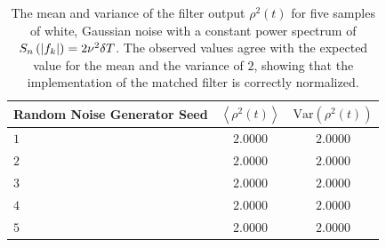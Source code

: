 \begin{table}[p]
\label{t:normresults}
\begin{center}
\begin{tabular}{l|c|c}
Random Noise Generator Seed& $\left\langle \rho^2(t) \right\rangle$ & $\mathrm{Var}( \rho^2(t) )$\\
\hline
$1$ & $2.0000$ & $2.0000$ \\
$2$ & $2.0000$ & $2.0000$ \\
$3$ & $2.0000$ & $2.0000$ \\
$4$ & $2.0000$ & $2.0000$ \\
$5$ & $2.0000$ & $2.0000$ \\
\end{tabular}
\end{center}
\caption[Mean and Variance of the Matched Filter Output for Gaussian Noise]{%
The mean and variance of the filter output $\rho^2(t)$ for five samples of
white, Gaussian noise with a constant power spectrum of $S_n\left(\left|f_{k}\right|\right) =
2\nu^2\delta T$. The observed values agree with the expected value for the
mean and the variance of $2$, showing that the implementation of the matched
filter is correctly normalized.
}
\end{table}

\newpage

